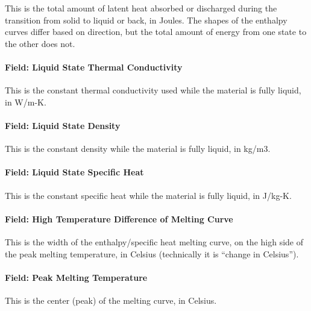 This is the total amount of latent heat absorbed or discharged during the transition from solid to liquid or back, in Joules.
The shapes of the enthalpy curves differ based on direction, but the total amount of energy from one state to the other does not.

\paragraph{Field: Liquid State Thermal Conductivity}\label{materialpropertyphasechangehysteresis-inputs-liquidk}

This is the constant thermal conductivity used while the material is fully liquid, in W/m-K.

\paragraph{Field: Liquid State Density}\label{materialpropertyphasechangehysteresis-inputs-liquidrho}

This is the constant density while the material is fully liquid, in kg/m3.

\paragraph{Field: Liquid State Specific Heat}\label{materialpropertyphasechangehysteresis-inputs-liquid-state-specific-heat}

This is the constant specific heat while the material is fully liquid, in J/kg-K.

\paragraph{Field: High Temperature Difference of Melting Curve}\label{materialpropertyphasechangehysteresis-inputs-high-temperature-difference-of-melting-curve}

This is the width of the enthalpy/specific heat melting curve, on the high side of the peak melting temperature, in Celsius (technically it is ``change in Celsius'').

\paragraph{Field: Peak Melting Temperature}\label{materialpropertyphasechangehysteresis-inputs-peak-melting-temperature}

This is the center (peak) of the melting curve, in Celsius.

